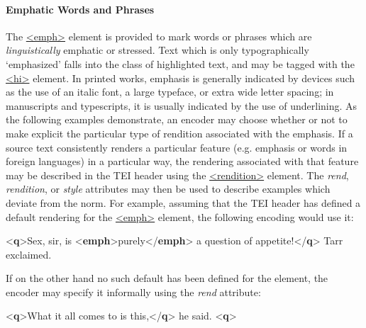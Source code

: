 \paragraph[{Emphatic Words and Phrases}]{Emphatic Words and Phrases}\label{COHQHE}\par
The \hyperref[TEI.emph]{<emph>} element is provided to mark words or phrases which are \textit{linguistically} emphatic or stressed. Text which is only typographically ‘emphasized’ falls into the class of highlighted text, and may be tagged with the \hyperref[TEI.hi]{<hi>} element. In printed works, emphasis is generally indicated by devices such as the use of an italic font, a large typeface, or extra wide letter spacing; in manuscripts and typescripts, it is usually indicated by the use of underlining. As the following examples demonstrate, an encoder may choose whether or not to make explicit the particular type of rendition associated with the emphasis. If a source text consistently renders a particular feature (e.g. emphasis or words in foreign languages) in a particular way, the rendering associated with that feature may be described in the TEI header using the \hyperref[TEI.rendition]{<rendition>} element. The {\itshape rend}, {\itshape rendition}, or {\itshape style} attributes may then be used to describe examples which deviate from the norm. For example, assuming that the TEI header has defined a default rendering for the \hyperref[TEI.emph]{<emph>} element, the following encoding would use it: \par\bgroup{}\exampleFont \begin{shaded}\noindent\mbox{}{<\textbf{q}>}Sex, sir, is {<\textbf{emph}>}purely{</\textbf{emph}>} a question\mbox{}\newline 
 of appetite!{</\textbf{q}>} Tarr exclaimed.\end{shaded}\egroup\par \noindent  If on the other hand no such default has been defined for the element, the encoder may specify it informally using the {\itshape rend} attribute: \par\bgroup{}\exampleFont \begin{shaded}\noindent\mbox{}{<\textbf{q}>}What it all comes to is this,{</\textbf{q}>} he said.\mbox{}\newline 
\mbox{}\newline 
{<\textbf{q}>}\mbox{}\newline 

\end{shaded}
